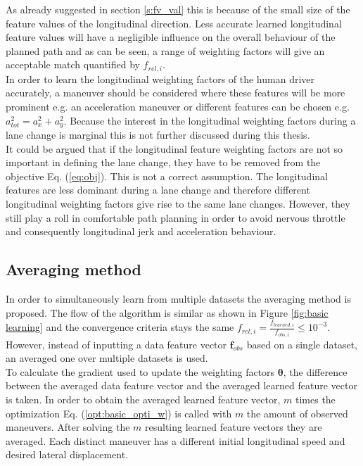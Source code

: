  As already suggested in section \ref{s:fv_val} this is because of the small size of the feature values of the longitudinal direction. Less accurate learned longitudinal feature values will have a negligible influence on the overall behaviour of the planned path and as can be seen, a range of weighting factors will give an acceptable match quantified by $f_{rel,i}$.\\
 In order to learn the longitudinal weighting factors of the human driver accurately, a maneuver should be considered where these features will be more prominent e.g. an acceleration maneuver or different features can be chosen e.g. $a_{tot}^2 = a_x^2 + a_y^2$. Because the interest in the longitudinal weighting factors during a lane change is marginal this is not further discussed during this thesis.\\          

It could be argued that if the longitudinal feature weighting factors are not so important in defining the lane change, they have to be removed from the objective Eq. (\ref{eq:obj}). This is not a correct assumption. The longitudinal features are less dominant during a lane change and therefore different longitudinal weighting factors give rise to the same lane changes. However, they still play a roll in comfortable path planning in order to avoid nervous throttle and consequently longitudinal jerk and acceleration behaviour. 


\subsection{Averaging method}\label{s:averaging_method}
In order to simultaneously learn from multiple datasets the averaging method is proposed. \cite{Kuderer2015a} The flow of the algorithm is similar as shown in Figure \ref{fig:basic learning} and the convergence criteria stays the same $f_{rel,i} = \frac{f_{learned,i}}{f_{obs,i}} \leq 10^{-3}$. However, instead of inputting a data feature vector $\bm{f}_{obs}$ based on a single dataset, an averaged one over multiple datasets is used.\\
To calculate the gradient used to update the weighting factors $\bm{\theta}$, the difference between the averaged data feature vector and the averaged learned feature vector is taken. In order to obtain the averaged learned feature vector, $m$ times the optimization Eq. (\ref{opt:basic_opti_w}) is called with $m$ the amount of observed maneuvers. After solving the $m$ resulting learned feature vectors they are averaged. Each distinct maneuver has a different initial longitudinal speed and desired lateral displacement.\\
 

